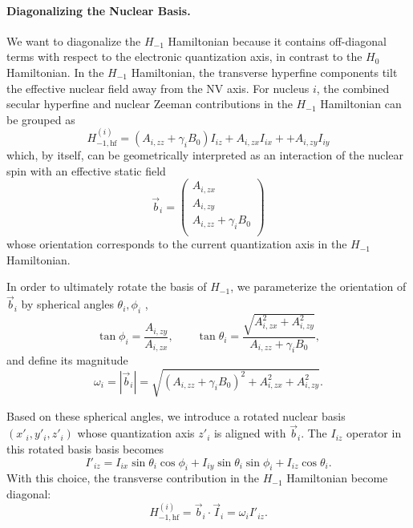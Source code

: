 \paragraph{Diagonalizing the Nuclear Basis.}
We want to diagonalize the $H_{-1}$ Hamiltonian because it contains off-diagonal terms with respect to the electronic quantization axis, in contrast to the $H_{0}$ Hamiltonian.
In the $H_{-1}$ Hamiltonian, the transverse hyperfine components tilt the effective nuclear field away from the NV axis. For nucleus $i$, the combined secular hyperfine and nuclear Zeeman contributions in the $H_{-1}$ Hamiltonian can be grouped as
\begin{equation}
    H^{(i)}_{-1,\mathrm{hf}} = (A_{i,zz}+\gamma_iB_0)I_{iz}
    +A_{i,zx}I_{ix}
    ++A_{i,zy}I_{iy}
    \label{eq:Hminus_hf}
\end{equation}
which, by itself, can be geometrically interpreted as an interaction of the nuclear spin with an effective static field
\[
\vec b_i = 
\begin{pmatrix}
A_{i,zx}\\
A_{i,zy}\\
A_{i,zz}+\gamma_iB_0\\
\end{pmatrix}
\]
whose orientation corresponds to the current quantization axis in the $H_{-1}$ Hamiltonian.


In order to ultimately rotate the basis of $H_{-1}$, we parameterize the orientation of $\vec b_i$ by spherical angles $\theta_i,\phi_i$ \cite{schweiger2001principles},
\begin{equation}
\tan\phi_i = \frac{A_{i,zy}}{A_{i,zx}},
\qquad
\tan\theta_i = \frac{\sqrt{A_{i,zx}^2+A_{i,zy}^2}}
{A_{i,zz}+\gamma_iB_0},
\label{eq:angles}
\end{equation}
and define its magnitude
\begin{equation}
\omega_i = |\vec b_i| =
\sqrt{ (A_{i,zz}+\gamma_iB_0)^2
+ A_{i,zx}^2
+ A_{i,zy}^2 }.
\label{eq:omega_i}
\end{equation}

Based on these spherical angles, we introduce a rotated nuclear basis $(x'_i,y'_i,z'_i)$ whose quantization axis $z'_i$ is aligned with $\vec b_i$. The $I_{iz}$ operator in this rotated basis basis becomes 
\begin{equation}
    I'_{iz} = I_{ix}\sin\theta_i\cos\phi_i 
    + I_{iy}\sin\theta_i\sin\phi_i 
    + I_{iz}\cos\theta_i.
    \label{eq:Izprime}
\end{equation}
With this choice, the transverse contribution in the $H_{-1}$ Hamiltonian become diagonal:
\[
H^{(i)}_{-1,\mathrm{hf}}= \vec b_i\cdot\vec I_i = \omega_i I'_{iz}.
\]

